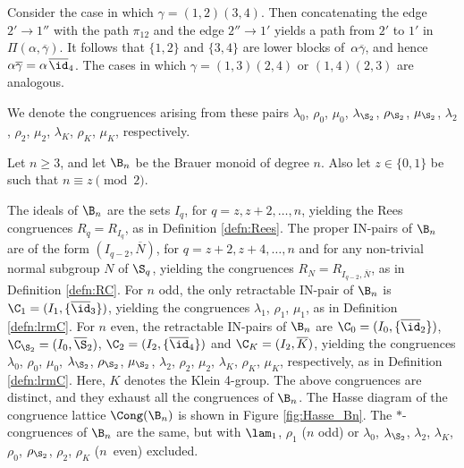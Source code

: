 Consider the case in which $\gamma=(1,2)(3,4)$. Then concatenating the edge $2'\to1''$ with the path $\pi_{12}$ and the edge $2''\to1'$ yields a path from $2'$ to $1'$ in $\Pi(\alpha,\overline{\gamma})$.
It follows that $\{1,2\}$ and $\{3,4\}$ are lower blocks of~$\alpha\overline{\gamma}$, and hence $\alpha\overline{\gamma}=\alpha\;\!\overline{\id}_4$.
%
The cases in which $\gamma=(1,3)(2,4)$ or $(1,4)(2,3)$ are analogous. \epf

We denote the congruences arising from these pairs
$\lambda_0$, $\rho_0$, $\mu_0$, $\lambda_{\S_2}$, $\rho_{\S_2}$, $\mu_{\S_2}$,
$\lambda_2$, $\rho_2$, $\mu_2$, $\lambda_K$, $\rho_K$, $\mu_K$, respectively.

\begin{thm}\label{CongBn}
Let $n\geq3$, and let $\B_n$ be the Brauer monoid of degree $n$.    Also let $z\in\{0,1\}$ be such that $n\equiv z\pmod{2}$.
\begin{itemize}
 The ideals of $\B_n$ are the sets $I_q$, for $q=z,z+2,\ldots,n$, yielding the Rees congruences $R_q=R_{I_q}$, as in Definition \ref{defn:Rees}.
 The proper IN-pairs of $\B_n$ are of the form $(I_{q-2},\overline N)$, for $q=z+2,z+4,\ldots,n$ and for any non-trivial normal subgroup $N$ of $\S_q$, yielding the congruences $R_N=R_{I_{q-2},\overline N}$, as in Definition \ref{defn:RC}.
 For $n$ odd, the only retractable IN-pair of $\B_n$ is $\C_1=(I_1,\{\overline\id_3\})$, yielding the congruences $\lambda_1$, $\rho_1$, $\mu_1$, as in Definition \ref{defn:lrmC}.
 For $n$ even, the retractable IN-pairs of $\B_n$ are $\C_0=(I_0,\{\overline{\id}_2\})$, $\C_{\S_2}=(I_0,\overline{\S}_2)$, $\C_2=(I_2,\{\overline{\id}_4\})$ and $\C_K=(I_2,\overline{K})$, yielding the congruences $\lambda_0$, $\rho_0$, $\mu_0$, $\lambda_{\S_2}$, $\rho_{\S_2}$, $\mu_{\S_2}$,
$\lambda_2$, $\rho_2$, $\mu_2$, $\lambda_K$, $\rho_K$, $\mu_K$, respectively, as in Definition \ref{defn:lrmC}.  Here, $K$ denotes the Klein 4-group.
 The above congruences are distinct, and they exhaust all the congruences of $\B_n$.
 The Hasse diagram of the congruence lattice $\Cong(\B_n) $ is shown in Figure \ref{fig:Hasse_Bn}.
 The $\ast$-congruences of $\B_n$ are the same, but with $\lam_1$, $\rho_1$ ($n$ odd) or $\lambda_0$, $\lambda_{\S_2}$, $\lambda_2$, $\lambda_K$, $\rho_0$, $\rho_{\S_2}$, $\rho_2$, $\rho_K$ ($n$~even) excluded.
\end{itemize}
\end{thm}

